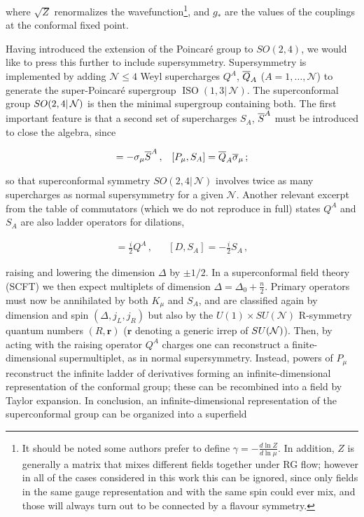where $\sqrt Z$ renormalizes the wavefunction\footnote{It should be noted some authors prefer to define $\gamma = - \frac{d\ln Z}{d \ln \mu}$. In addition, $Z$ is generally a matrix that mixes different fields together under RG flow; however in all of the cases considered in this work this can be ignored, since only fields in the same gauge representation and with the same spin could ever mix, and those will always turn out to be connected by a flavour symmetry.}, and $g_*$ are the values of the couplings at the conformal fixed point.

Having introduced the extension of the Poincar\'e group to $SO(2,4)$, we would like to press this further to include supersymmetry. Supersymmetry is implemented by adding $\mathcal{N} \leq 4$ Weyl supercharges $Q^A$, $\overline{Q}_A$ ($A=1,\ldots,\mathcal{N}$) to generate the super-Poincar\'e supergroup $\operatorname{ISO}(1,3|\,\mathcal{N})$. The superconformal group $SO(2,4|\,\mathcal{N})$ is then the minimal supergroup containing both. The first important feature is that a second set of supercharges $S_A$, $\overline{S}^A$ must be introduced to close the algebra, since

\begin{align}
	[K_\mu , Q^A] = - \sigma_\mu \scj{S}^A\,, && [P_\mu, S_A] = \scj{Q}_A  \scj\sigma_\mu \,;
	\label{}
\end{align}

so that superconformal symmetry $SO(2,4|\,\mathcal{N})$ involves twice as many supercharges as normal supersymmetry for a given $\mathcal{N}$. Another relevant excerpt from the table of commutators (which we do not reproduce in full) states $Q^A$ and $S_A$ are also ladder operators for dilations,

\begin{align}
	[D,Q^A] = \frac{i}{2} Q^A\,, && [D,S_A] = - \frac{i}{2} S_A\,,
	\label{}
\end{align}

raising and lowering the dimension $\Delta$ by $\pm 1/2$. In a superconformal field theory (SCFT) we then expect multiplets of dimension $\Delta = \Delta_0 + \frac{n}{2}$. Primary operators must now be annihilated by both $K_\mu$ and $S_A$, and are classified again by dimension and spin $(\Delta,j_L,j_R)$ but also by the $U(1)\times SU(\mathcal{N})$ R-symmetry quantum numbers $(R,\mathbf{r})$ ($\mathbf{r}$ denoting a generic irrep of $SU(\mathcal{N})$). Then, by acting with the raising operator $Q^A$ charges one can reconstruct a finite-dimensional supermultiplet, as in normal supersymmetry. Instead, powers of $P_\mu$ reconstruct the infinite ladder of derivatives forming an infinite-dimensional representation of the conformal group; these can be recombined into a field by Taylor expansion. In conclusion, an infinite-dimensional representation of the superconformal group can be organized into a superfield

